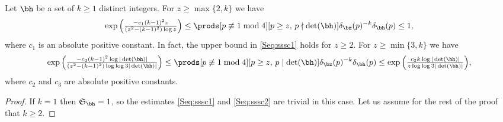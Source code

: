 \documentclass[12pt, reqno, twoside, letterpaper]{amsart}
\begin{document}
\begin{nixnix}
%
\begin{proposition}
 \label{Sprop:sssc}
Let $\bh$ be a set of $k \ge 1$ distinct integers.
%
For $z \ge \max\{2,k\}$ we have 
\begin{equation}
 \label{Seq:sssc1}
  {\textstyle 
  \exp 
   \Big(
    \frac{-c_1(k - 1)^2 z}{(z^2 - (k - 1)^2)\log z}
   \Big)
  }
    \le 
     \prods[p \not\equiv 1 \bmod 4][p \ge z, \, p \nmid \det(\bh)] 
      \delta_{\bz}(p)^{-k}\delta_{\bh}(p)
     \le 
      1,
\end{equation}
where $c_1$ is an absolute positive constant.
%
In fact, the upper bound in \eqref{Seq:sssc1} holds for 
$z \ge 2$.
%
For $z \ge \min\{3,k\}$ we have 
\begin{equation}
 \label{Seq:sssc2}
 {\textstyle 
  \exp 
   \Big(
    \frac{-c_2(k - 1)^2\log |\det(\bh)|}{(z^2 - (k - 1)^2)\log\log 3|\det(\bh)|}
   \Big)
 }
    \le 
     \prods[p \not\equiv 1 \bmod 4][p \ge z, \, p \mid \det(\bh)]
      \delta_{\bz}(p)^{-k}\delta_{\bh}(p)
     \le  
       {\textstyle 
         \exp 
          \Big(
           \frac{c_3k\log |\det(\bh)|}{z\log\log 3|\det(\bh)|}
          \Big) 
 },
\end{equation}
where $c_2$ and $c_3$ are absolute positive constants.
\end{proposition}

\begin{proof}
%
If $k = 1$ then $\mathfrak{S}_{\bh} = 1$, so the estimates 
\eqref{Seq:sssc1} and  \eqref{Seq:sssc2} are 
trivial in this case.
%
Let us assume for the rest of the proof that $k \ge 2$.


\end{proof}
\end{nixnix}
\end{document}
